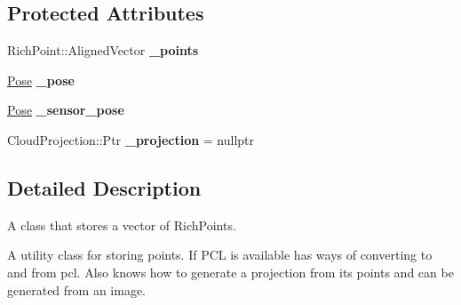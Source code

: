 \subsection*{Protected Attributes}
\begin{DoxyCompactItemize}
\item 
\mbox{\label{classdepth__clustering_1_1Cloud_a6827950219a447bb1d3c390168d3397d}} 
Rich\+Point\+::\+Aligned\+Vector {\bfseries \+\_\+points}
\item 
\mbox{\label{classdepth__clustering_1_1Cloud_a3b6a1ada445763ab4b9ac9519bb225f1}} 
\hyperlink{classdepth__clustering_1_1Pose}{Pose} {\bfseries \+\_\+pose}
\item 
\mbox{\label{classdepth__clustering_1_1Cloud_a6399645406eaa1312ca4a469d7c4db1f}} 
\hyperlink{classdepth__clustering_1_1Pose}{Pose} {\bfseries \+\_\+sensor\+\_\+pose}
\item 
\mbox{\label{classdepth__clustering_1_1Cloud_a5f60147c48b39a951d4fa72ba60ef370}} 
Cloud\+Projection\+::\+Ptr {\bfseries \+\_\+projection} = nullptr
\end{DoxyCompactItemize}


\subsection{Detailed Description}
A class that stores a vector of Rich\+Points. 

A utility class for storing points. If P\+CL is available has ways of converting to and from pcl. Also knows how to generate a projection from its points and can be generated from an image. 

